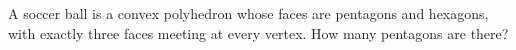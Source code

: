 A soccer ball is a convex polyhedron whose faces are pentagons and hexagons, with exactly three faces meeting at every vertex. How many pentagons are there?
